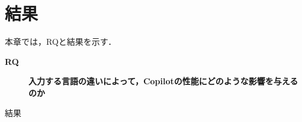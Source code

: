 \section{結果\label{result}}
  \begin{table}[t]
    \centering
    \caption{英語における正解率}
    \label{En_accuracy}
  \end{table}

  本章では，RQと結果を示す．
  \begin{description}
    \item[\textbf{RQ}] \textbf{入力する言語の違いによって，Copilotの性能にどのような影響を与えるのか}
      \item[結果]
      
      
  \end{description}